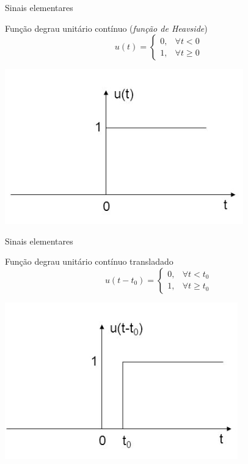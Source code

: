 \begin{frame}{Sinais elementares}
\begin{block}{Função degrau unitário contínuo (\textit{função de Heavside})}
\begin{equation*}
u(t) = \begin{cases}
0, & \forall t < 0 \\
1, & \forall t \geq 0
\end{cases}
\end{equation*}
\end{block}
\centerline{\includegraphics[width=0.5\linewidth]{Figuras/Ch01/fig4.PNG}}
\end{frame}

\begin{frame}{Sinais elementares}
\begin{block}{Função degrau unitário contínuo transladado}
\begin{equation*}
u(t - t_0) = \begin{cases}
0, & \forall t < t_0 \\
1, & \forall t \geq t_0
\end{cases}
\end{equation*}
\end{block}
\centerline{\includegraphics[width=0.5\linewidth]{Figuras/Ch01/fig5.PNG}}
\end{frame}

